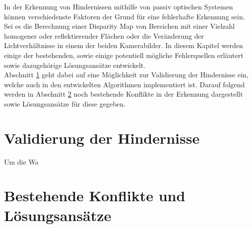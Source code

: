 In der Erkennung von Hindernissen mithilfe von passiv optischen Systemen können verschiedenste Faktoren der Grund für eine fehlerhafte Erkennung sein. Sei es die Berechnung einer Disparity Map von Bereichen mit einer Vielzahl homogener oder reflektierender Flächen oder die Veränderung der Lichtverhältnisse in einem der beiden Kamerabilder. In diesem Kapitel werden einige der bestehenden, sowie einige potentiell mögliche Fehlerquellen erläutert sowie dazugehörige Lösungsansätze entwickelt.\\

Abschnitt \ref{sec:obstacle_validation} geht dabei auf eine Möglichkeit zur Validierung der Hindernisse ein, welche auch in den entwickelten Algorithmen implementiert ist. Darauf folgend werden in Abschnitt \ref{sec:existing_conflicts} noch bestehende Konflikte in der Erkennung dargestellt sowie Lösungsansätze für diese gegeben.

\section{Validierung der Hindernisse}
\label{sec:obstacle_validation}

Um die Wa

\section{Bestehende Konflikte und Lösungsansätze}
\label{sec:existing_conflicts}


